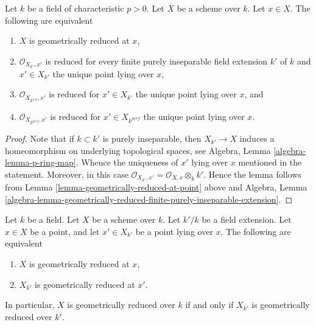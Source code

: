 \begin{lemma}
\label{lemma-check-only-finite-inseparable-extensions}
Let $k$ be a field of characteristic $p > 0$. Let $X$ be a scheme over $k$.
Let $x \in X$. The following are equivalent
\begin{enumerate}
\item $X$ is geometrically reduced at $x$,
\item $\mathcal{O}_{X_{k'}, x'}$ is reduced for every
finite purely inseparable field extension $k'$ of $k$ and
$x' \in X_{k'}$ the unique point lying over $x$,
\item $\mathcal{O}_{X_{k^{1/p}}, x'}$ is reduced for
$x' \in X_{k'}$ the unique point lying over $x$, and
\item $\mathcal{O}_{X_{k^{perf}}, x'}$ is reduced for
$x' \in X_{k^{perf}}$ the unique point lying over $x$.
\end{enumerate}
\end{lemma}

\begin{proof}
Note that if $k \subset k'$ is purely inseparable, then
$X_{k'} \to X$ induces a homeomorphism on underlying topological
spaces, see Algebra, Lemma \ref{algebra-lemma-p-ring-map}.
Whence the uniqueness of $x'$ lying over $x$ mentioned in the
statement. Moreover, in this case
$\mathcal{O}_{X_{k'}, x'} = \mathcal{O}_{X, x} \otimes_k k'$.
Hence the lemma follows from Lemma \ref{lemma-geometrically-reduced-at-point}
above and Algebra, Lemma
\ref{algebra-lemma-geometrically-reduced-finite-purely-inseparable-extension}.
\end{proof}

\begin{lemma}
\label{lemma-geometrically-reduced-upstairs}
Let $k$ be a field.
Let $X$ be a scheme over $k$.
Let $k'/k$ be a field extension.
Let $x \in X$ be a point, and let $x' \in X_{k'}$ be a point lying over $x$.
The following are equivalent
\begin{enumerate}
\item $X$ is geometrically reduced at $x$,
\item $X_{k'}$ is geometrically reduced at $x'$.
\end{enumerate}
In particular, $X$ is geometrically reduced over $k$ if and only if
$X_{k'}$ is geometrically reduced over $k'$.
\end{lemma}

